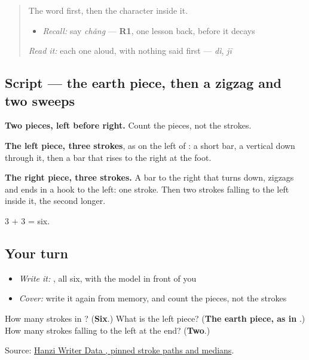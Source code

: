 \begin{quote}
The word first, then the character inside it.

\begin{itemize}
\raggedright
  \item \emph{Recall:} say \emph{chǎng} — \textbf{R1}, one lesson back, before it decays
\end{itemize}

\begin{quote}
 
\end{quote}

\emph{Read it:} each one aloud, with nothing said first — \emph{dì}, \emph{jī}
\end{quote}

\subsection*{Script — the earth piece, then a zigzag and two sweeps}

\begin{quote}
\end{quote}

\textbf{Two pieces, left before right.} Count the pieces, not the strokes.

\textbf{The left piece, three strokes}, as on the left of : a short bar, a vertical down through it, then a bar that rises to the right at the foot.

\textbf{The right piece, three strokes.} A bar to the right that turns down, zigzags and ends in a hook to the left: one stroke. Then two strokes falling to the left inside it, the second longer.

3 + 3 = six.

\subsection*{Your turn}
\begin{itemize}
\raggedright
  \item \emph{Write it:} , all six, with the model in front of you
  \item \emph{Cover:} write it again from memory, and count the pieces, not the strokes
\end{itemize}

\begin{tcolorbox}[breakable,colback=teal!4,colframe=teal!35!black,title={Before you move on}]
How many strokes in ? (\textbf{Six}.) What is the left piece? (\textbf{The earth piece, as in }.) How many strokes falling to the left at the end? (\textbf{Two}.)

Source: \href{https://raw.githubusercontent.com/chanind/hanzi-writer-data/68d10a4b21150cae5e1ebbd223eed289cf32d90c/data/\%E5\%9C\%BA.json}{Hanzi Writer Data , pinned stroke paths and medians}.
\end{tcolorbox}
